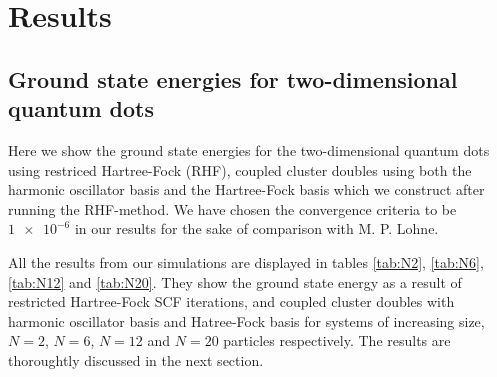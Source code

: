 \documentclass[
    a4paper, aps, twocolumn, floatfix, superscriptaddress,
    nofootinbib]{revtex4-1}
\newcommand{\1}{\mathds{1}}
\begin{document}
\section{Results}

    \subsection{Ground state energies for two-dimensional quantum dots}
        Here we show the ground state energies for the two-dimensional quantum
        dots using restriced Hartree-Fock (RHF), coupled cluster doubles using
        both the harmonic oscillator basis and the Hartree-Fock basis which we
        construct after running the RHF-method. We have chosen the convergence
        criteria to be $\num{1e-6}$ in our results for the sake of comparison
        with M. P. Lohne\cite{lohne2011ab}.

        All the results from our simulations are displayed in tables \ref{tab:N2},
        \ref{tab:N6}, \ref{tab:N12} and \ref{tab:N20}. They show the ground state
        energy as a result of restricted Hartree-Fock SCF iterations, and coupled
        cluster doubles with harmonic oscillator basis and Hatree-Fock basis for
        systems of increasing size, $N=2$, $N=6$, $N=12$ and $N=20$ particles
        respectively. The results are thoroughtly discussed in the next section.
\end{document}
